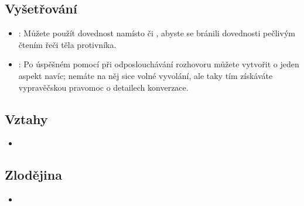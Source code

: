 \subsection{Vyšetřování}
\label{sec:trik-vysetrovani}
\begin{itemize}

\item{}:
\label{sec:vysetrovani-mikro}
Můžete použít dovednost  namísto  či , abyste se bránili dovednosti  pečlivým čtením řeči těla protivníka.

\item{}
\label{sec:vysetrovani-fizlovani}:
Po úspěšném  pomocí  při odposlouchávání rozhovoru můžete vytvořit o jeden aspekt navíc; nemáte na něj sice volné vyvolání, ale taky tím získáváte vypravěčskou pravomoc o detailech konverzace.
\end{itemize}


\subsection{Vztahy}
\label{sec:trik-vztahy}
\begin{itemize}
  \item
\end{itemize}

\subsection{Zlodějina}
\label{sec:trik-zlodejina}
\begin{itemize}
  \item
\end{itemize}
  



